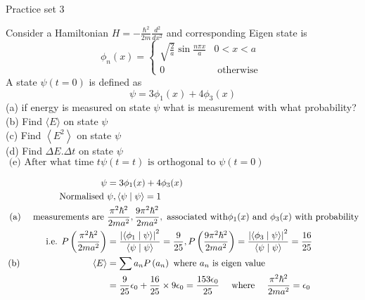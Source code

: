 \newpage
\begin{abox}
	Practice set 3
	\end{abox}
\begin{enumerate}
	\begin{minipage}{\textwidth}
	\item Consider a Hamiltonian $H=-\frac{\hbar^{2}}{2 m} \frac{d^{2}}{d x^{2}}$ and corresponding Eigen state is
	$$
	\phi_{n}(x)=\left\{\begin{array}{cc}
	\sqrt{\frac{2}{a}} \sin \frac{n \pi x}{a} & 0<x<a \\
	0 & \text { otherwise }
	\end{array}\right.
	$$
	A state $\psi(t=0)$ is defined as
	$$
	\psi=3 \phi_{1}(x)+4 \phi_{3}(x)
	$$
	(a) if energy is measured on state $\psi$ what is measurement with what probability?\\
	(b) Find $\langle E\rangle$ on state $\psi$\\
	(c) Find $\left\langle E^{2}\right\rangle$ on state $\psi$\\
	(d) Find $\Delta E . \Delta t$ on state $\psi$\\
	$\text { (e) After what time } t \psi(t=t) \text { is orthogonal to } \psi(t=0)$
\end{minipage}
\begin{answer}
	\begin{align*}
  \psi&=3 \phi_{1}(x)+4 \phi_{3}(x)\\
\text{	Normalised }&\psi,\langle\psi \mid \psi\rangle=1\\
\text{	(a) $\quad $measurements are }&\frac{\pi^{2} \hbar^{2}}{2 m a^{2}}, \frac{9 \pi^{2} \hbar^{2}}{2 m a^{2}},\text{ associated with} \phi_{1}(x)\text{ and }\phi_{3}(x)\text{ with probability}\\
	\text{i.e. }P\left(\frac{\pi^{2} \hbar^{2}}{2 m a^{2}}\right)&=\frac{\left|\left\langle\phi_{1} \mid \psi\right\rangle\right|^{2}}{\langle\psi \mid \psi\rangle}=\frac{9}{25}, P\left(\frac{9 \pi^{2} \hbar^{2}}{2 m a^{2}}\right)=\frac{\left|\left\langle\phi_{3} \mid \psi\right\rangle\right|^{2}}{\langle\psi \mid \psi\rangle}=\frac{16}{25}\\
	\text{(b) }\hspace{2.7cm}\langle E\rangle&=\sum a_{n} P\left(a_{n}\right)\text{ where $a_{n}$ is eigen value}\\
	&=\frac{9}{25} \epsilon_{0}+\frac{16}{25} \times 9 \epsilon_{0}=\frac{153 \epsilon_{0}}{25} \quad\text{ where }\quad \frac{\pi^{2} \hbar^{2}}{2 m a^{2}}=\epsilon_{0}\\\\

\end{align*}
\end{answer}
\end{enumerate}
